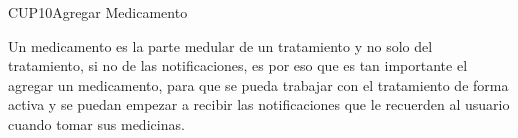 \begin{UseCase}{CUP10}{Agregar Medicamento}
	{
		
		Un medicamento es la parte medular de un tratamiento y no solo del tratamiento, si no de las notificaciones, es por eso que es tan importante el agregar un medicamento, para que se pueda trabajar con el tratamiento de forma activa y se puedan empezar a recibir las notificaciones que le recuerden al usuario cuando tomar sus medicinas.
		
	}
	

\end{UseCase}
